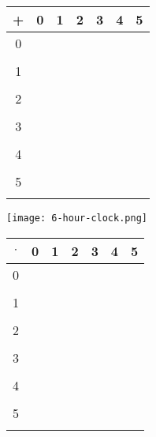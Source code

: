 \documentclass[11pt]{article}
\begin{document}
\begin{enumerate}
\begin{enumerate}
\begin{minipage}[t]{0.4\textwidth}
\begin{tabular}{|c||c|c|c|c|c|c|}
\hline
+ & 0 & 1 & 2 &  3  & 4 & 5 \\ \hline \hline
0 & \hspace*{.2in} & \hspace*{.2in} & \hspace*{.2in} &
\hspace*{.2in} & \hspace*{.2in} & \hspace*{.2in}\\
  &  &  &  &  &  &  \\ \hline
1 &  &  &  &  &  & \\
  &  &  &  &  &  & \\ \hline
2 &  &  &  &  &  & \\
  &  &  &  &  &  & \\ \hline
3 &  &  &  &  &  & \\
  &  &  &  &  &  & \\ \hline
4 &  &  &  &  &  & \\
  &  &  &  &  &  & \\ \hline
5 &  &  &  &  &  & \\
  &  &  &  &  &  & \\ \hline
\end{tabular}
\end{minipage}
\begin{minipage}[t]{0.2\textwidth}
\texttt{[image: 6-hour-clock.png]}
\end{minipage}
\begin{minipage}[t]{0.4\textwidth}
\begin{tabular}{|c||c|c|c|c|c|c|}
\hline
$\cdot$ & 0 & 1 & 2 &  3  & 4 & 5 \\ \hline \hline
0 & \hspace*{.2in} & \hspace*{.2in} & \hspace*{.2in} &
\hspace*{.2in} & \hspace*{.2in} & \hspace*{.2in}\\
  &  &  &  &  &  &  \\ \hline
1 &  &  &  &  &  & \\
  &  &  &  &  &  & \\ \hline
2 &  &  &  &  &  & \\
  &  &  &  &  &  & \\ \hline
3 &  &  &  &  &  & \\
  &  &  &  &  &  & \\ \hline
4 &  &  &  &  &  & \\
  &  &  &  &  &  & \\ \hline
5 &  &  &  &  &  & \\
  &  &  &  &  &  & \\ \hline
\end{tabular}
\end{minipage}


\end{enumerate}
\end{enumerate}
\end{document}
